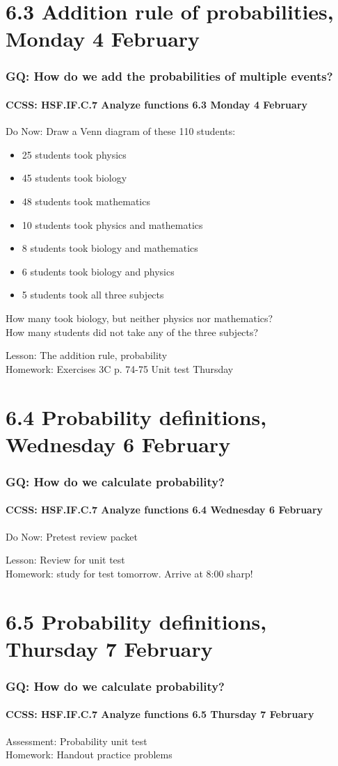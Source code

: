 \documentclass{beamer}
\begin{document}
\section{6.3 Addition rule of probabilities, Monday 4 February}
  \frame
  {
    \frametitle{GQ: How do we add the probabilities of multiple events?}
    \framesubtitle{CCSS: HSF.IF.C.7 Analyze functions \hfill \alert{6.3 Monday 4 February}}

    \begin{block}{Do Now: Draw a Venn diagram of these 110 students:}
      \begin{itemize}
        \item 25 students took physics
        \item 45 students took biology
        \item 48 students took mathematics
        \item 10 students took physics and mathematics
        \item 8 students took biology and mathematics
        \item 6 students took biology and physics
        \item 5 students took all three subjects
      \end{itemize}
      How many took biology, but neither physics nor mathematics?\\
      How many students did not take any of the three subjects?
    \end{block}
    Lesson: The addition rule, probability \\
    Homework: Exercises 3C p. 74-75 \alert{Unit test Thursday}
  }

  \section{6.4 Probability definitions, Wednesday 6 February}
    \frame
    {
      \frametitle{GQ: How do we calculate probability?}
      \framesubtitle{CCSS: HSF.IF.C.7 Analyze functions \hfill \alert{6.4 Wednesday 6 February}}

      \begin{block}{Do Now: Pretest review packet}
      \end{block}
      Lesson: Review for unit test \\ \bigskip
      Homework: study for \alert{test tomorrow}. Arrive at 8:00 sharp!
    }


\section{6.5 Probability definitions, Thursday 7 February}
  \frame
  {
    \frametitle{GQ: How do we calculate probability?}
    \framesubtitle{CCSS: HSF.IF.C.7 Analyze functions \hfill \alert{6.5 Thursday 7 February}}

    Assessment: Probability unit test \\ \bigskip
    Homework: Handout practice problems
  }
\end{document}
